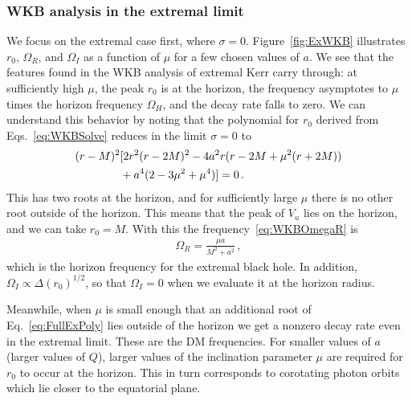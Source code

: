 \begin{refsection}
\subsubsection{WKB analysis in the extremal limit}

We focus on the extremal case first, where $\sigma = 0$. Figure~\ref{fig:ExWKB} illustrates $r_0$, $\Omega_R$, and $\Omega_I$ as a function of $\mu$ for a few chosen values of $a$. 
We see that the features found in the WKB analysis of extremal Kerr carry through: at sufficiently high $\mu$, the peak $r_0$ is at the horizon, the frequency asymptotes to $\mu$ times the horizon frequency $\Omega_H$, and the decay rate falls to zero. 
We can understand this behavior by noting that the polynomial for $r_0$ derived from Eqs.~\eqref{eq:WKBSolve} reduces in the limit $\sigma = 0$ to 
\begin{align}
\label{eq:FullExPoly}
(r-M)^2 &[2r^2(r-2M)^2 - 4a^2r(r-2M + \mu^2(r+2M)) \notag \\
&+ a^4 (2 - 3 \mu^2 + \mu^4)] =0\,.
\end{align} 
This has two roots at the horizon, and for sufficiently large $\mu$ there is no other root outside of the horizon. This means that the peak of $V_u$ lies on the horizon, and we can take $r_0 = M$. With this the frequency~\eqref{eq:WKBOmegaR} is
\begin{align}
\Omega_R = \frac{\mu a}{M^2+a^2} \,,
\end{align}
which is the horizon frequency for the extremal black hole.
In addition, $\Omega_I \propto \Delta(r_0)^{1/2}$, so that $\Omega_I = 0 $ when we evaluate it at the horizon radius. 

Meanwhile, when $\mu$ is small enough that an additional root of Eq.~\eqref{eq:FullExPoly} lies outside of the horizon we get a nonzero decay rate even in the extremal limit.
These are the DM frequencies. 
For smaller values of $a$ (larger values of $Q$), larger values of the inclination parameter $\mu$ are required for $r_0$ to occur at the horizon. 
This in turn corresponds to corotating photon orbits which lie closer to the equatorial plane.



\end{refsection}
